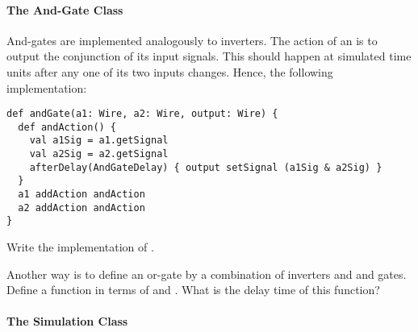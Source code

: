 \paragraph{The And-Gate Class}
And-gates are implemented analogously to inverters.  The action of an
 is to output the conjunction of its input signals.
This should happen at  simulated time units after
any one of its two inputs changes. Hence, the following implementation:
\begin{lstlisting}
def andGate(a1: Wire, a2: Wire, output: Wire) {
  def andAction() {
    val a1Sig = a1.getSignal
    val a2Sig = a2.getSignal
    afterDelay(AndGateDelay) { output setSignal (a1Sig & a2Sig) }
  }
  a1 addAction andAction
  a2 addAction andAction
}
\end{lstlisting}

\begin{exercise} Write the implementation of .
\end{exercise}

\begin{exercise} Another way is to define an or-gate by a combination of
inverters and and gates. Define a function  in terms of
 and . What is the delay time of this function?
\end{exercise}

\paragraph{The Simulation Class}

